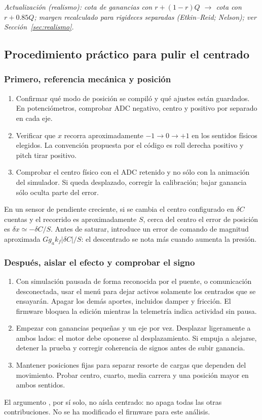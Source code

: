 \documentclass[11pt,a4paper]{article}
\newcommand{\code}[1]{\texttt{\detokenize{#1}}}
\begin{document}
\textit{Actualización (realismo): cota de ganancias con $r+(1-r)Q$ $\rightarrow$ cota con $r+0.85Q$; margen recalculado para rigideces separadas (Etkin--Reid; Nelson); ver Sección~\ref{sec:realismo}.}

\subsection{Procedimiento práctico para pulir el centrado}
\subsubsection{Primero, referencia mecánica y posición}
\begin{enumerate}
\item Confirmar qué modo de posición se compiló y qué ajustes están guardados. En potenciómetros, comprobar ADC negativo, centro y positivo por separado en cada eje.
\item Verificar que $x$ recorra aproximadamente $-1\to0\to+1$ en los sentidos físicos elegidos. La convención propuesta por el código es roll derecha positivo y pitch tirar positivo.
\item Comprobar el centro físico con el ADC retenido y no sólo con la animación del simulador. Si queda desplazado, corregir la calibración; bajar ganancia sólo oculta parte del error.
\end{enumerate}
En un sensor de pendiente creciente, si se cambia el centro configurado en $\delta C$ cuentas y el recorrido es aproximadamente $S$, cerca del centro el error de posición es $\delta x\simeq-\delta C/S$. Antes de saturar, introduce un error de comando de magnitud aproximada $Gg_ak_f|\delta C|/S$: el descentrado se nota más cuando aumenta la presión.

\subsubsection{Después, aislar el efecto y comprobar el signo}
\begin{enumerate}
\item Con simulación pausada de forma reconocida por el puente, o comunicación desconectada, usar el menú para dejar activos solamente los centrados que se ensayarán. Apagar los demás aportes, incluidos damper y fricción. El firmware bloquea la edición mientras la telemetría indica actividad sin pausa.
\item Empezar con ganancias pequeñas y un eje por vez. Desplazar ligeramente a ambos lados: el motor debe oponerse al desplazamiento. Si empuja a alejarse, detener la prueba y corregir coherencia de signos antes de subir ganancia.
\item Mantener posiciones fijas para separar resorte de cargas que dependen del movimiento. Probar centro, cuarto, media carrera y una posición mayor en ambos sentidos.
\end{enumerate}
El argumento \code{--no-buffets}, por sí solo, no aísla centrado: no apaga todas las otras contribuciones. No se ha modificado el firmware para este análisis.
\end{document}
